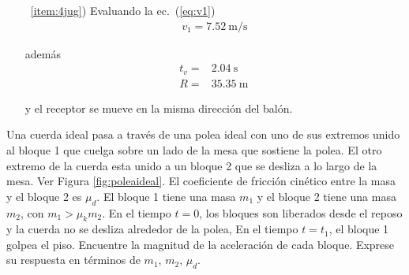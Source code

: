 \begin{itemize}
    
  \item[~\ref{item:4jug})]Evaluando la ec.~(\ref{eq:v1})
    \begin{align*}
      v_1=\SI{7.52}{\meter\per\second}
    \end{align*}

además 
\begin{align*}
t_v=&\SI{2.04}{\second}\nonumber\\
 R=&\SI{35.35}{\meter}\,
\end{align*}

y el receptor se mueve en la misma dirección del balón.\finejemplo
  \end{itemize}



\ejercicio{}
\begin{frame}
 Una cuerda ideal pasa a través de una polea ideal con uno de sus
  extremos unido al bloque 1 que cuelga sobre un lado de la mesa que
  sostiene la polea. El otro extremo de la cuerda esta unido a un
  bloque 2 que se desliza a lo largo de la mesa. Ver Figura
  \ref{fig:poleaideal}. El coeficiente de fricción cinético entre la
  masa y el bloque 2 es $\mu_d$. El bloque 1 tiene una masa $m_1$ y el
  bloque 2 tiene una masa $m_2$, con $m_1>\mu_k m_2$. En el tiempo
  $t=0$, los bloques son liberados desde el reposo y la cuerda no se
  desliza alrededor de la polea, En el tiempo $t=t_1$, el bloque 1
  golpea el piso. Encuentre la magnitud de la aceleración de cada
  bloque. Exprese su respuesta en términos de $m_1$, $m_2$, $\mu_d$. 
\end{frame}

